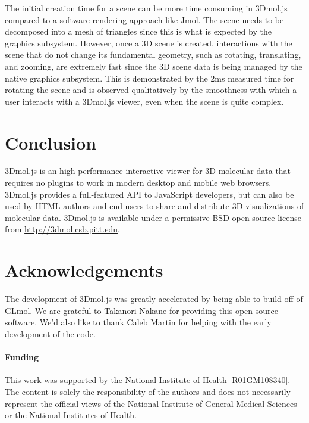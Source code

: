 \documentclass[]{bioinfo}
\begin{document}
The initial creation time for a scene can be more time consuming in 3Dmol.js compared to a software-rendering approach like Jmol.
 The scene needs to be decomposed into a mesh of triangles since this is what is expected
by the graphics subsystem.  However, once a 3D scene is created, interactions with the scene that do not change its fundamental geometry,
such as rotating, translating, and zooming, are extremely fast since the 3D scene data is being managed by the native graphics subsystem.
This is demonstrated by the 2ms measured time for rotating the scene and is observed qualitatively by the smoothness with which a user 
 interacts with a 3Dmol.js viewer, even when the scene is quite complex. 

\section{Conclusion}
3Dmol.js is an high-performance interactive viewer for 3D molecular data that requires no plugins to work in modern desktop and mobile web browsers.
3Dmol.js provides a full-featured API to JavaScript developers, but can also be used by HTML authors and end users to share and distribute
3D visualizations of molecular data. 3Dmol.js is available under a permissive BSD open source license from \url{http://3dmol.csb.pitt.edu}.
 
\section*{Acknowledgements}
The development of 3Dmol.js was greatly accelerated by being able to build off of GLmol.  We
are grateful to Takanori Nakane for providing this open source software. 
We'd also like to thank Caleb Martin for helping with the early development of the code.

\paragraph{Funding\textcolon} 
This work was supported by the National Institute of Health [R01GM108340].
The content is solely the responsibility of the authors and does not necessarily
represent the official views of the National Institute of General Medical Sciences
or the National Institutes of Health.



\end{document}
